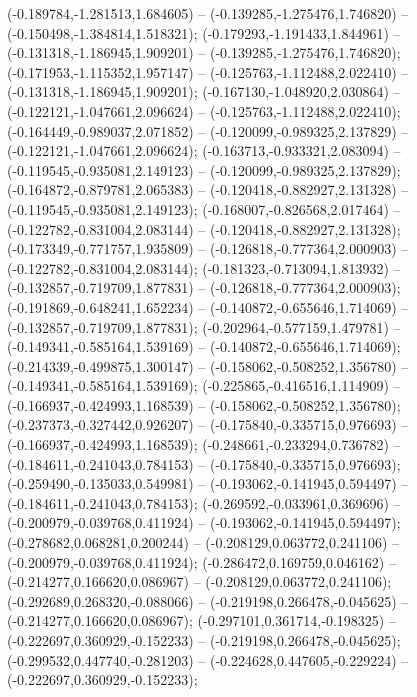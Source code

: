  (-0.189784,-1.281513,1.684605) -- (-0.139285,-1.275476,1.746820) -- (-0.150498,-1.384814,1.518321);
 (-0.179293,-1.191433,1.844961) -- (-0.131318,-1.186945,1.909201) -- (-0.139285,-1.275476,1.746820);
 (-0.171953,-1.115352,1.957147) -- (-0.125763,-1.112488,2.022410) -- (-0.131318,-1.186945,1.909201);
 (-0.167130,-1.048920,2.030864) -- (-0.122121,-1.047661,2.096624) -- (-0.125763,-1.112488,2.022410);
 (-0.164449,-0.989037,2.071852) -- (-0.120099,-0.989325,2.137829) -- (-0.122121,-1.047661,2.096624);
 (-0.163713,-0.933321,2.083094) -- (-0.119545,-0.935081,2.149123) -- (-0.120099,-0.989325,2.137829);
 (-0.164872,-0.879781,2.065383) -- (-0.120418,-0.882927,2.131328) -- (-0.119545,-0.935081,2.149123);
 (-0.168007,-0.826568,2.017464) -- (-0.122782,-0.831004,2.083144) -- (-0.120418,-0.882927,2.131328);
 (-0.173349,-0.771757,1.935809) -- (-0.126818,-0.777364,2.000903) -- (-0.122782,-0.831004,2.083144);
 (-0.181323,-0.713094,1.813932) -- (-0.132857,-0.719709,1.877831) -- (-0.126818,-0.777364,2.000903);
 (-0.191869,-0.648241,1.652234) -- (-0.140872,-0.655646,1.714069) -- (-0.132857,-0.719709,1.877831);
 (-0.202964,-0.577159,1.479781) -- (-0.149341,-0.585164,1.539169) -- (-0.140872,-0.655646,1.714069);
 (-0.214339,-0.499875,1.300147) -- (-0.158062,-0.508252,1.356780) -- (-0.149341,-0.585164,1.539169);
 (-0.225865,-0.416516,1.114909) -- (-0.166937,-0.424993,1.168539) -- (-0.158062,-0.508252,1.356780);
 (-0.237373,-0.327442,0.926207) -- (-0.175840,-0.335715,0.976693) -- (-0.166937,-0.424993,1.168539);
 (-0.248661,-0.233294,0.736782) -- (-0.184611,-0.241043,0.784153) -- (-0.175840,-0.335715,0.976693);
 (-0.259490,-0.135033,0.549981) -- (-0.193062,-0.141945,0.594497) -- (-0.184611,-0.241043,0.784153);
 (-0.269592,-0.033961,0.369696) -- (-0.200979,-0.039768,0.411924) -- (-0.193062,-0.141945,0.594497);
 (-0.278682,0.068281,0.200244) -- (-0.208129,0.063772,0.241106) -- (-0.200979,-0.039768,0.411924);
 (-0.286472,0.169759,0.046162) -- (-0.214277,0.166620,0.086967) -- (-0.208129,0.063772,0.241106);
 (-0.292689,0.268320,-0.088066) -- (-0.219198,0.266478,-0.045625) -- (-0.214277,0.166620,0.086967);
 (-0.297101,0.361714,-0.198325) -- (-0.222697,0.360929,-0.152233) -- (-0.219198,0.266478,-0.045625);
 (-0.299532,0.447740,-0.281203) -- (-0.224628,0.447605,-0.229224) -- (-0.222697,0.360929,-0.152233);
